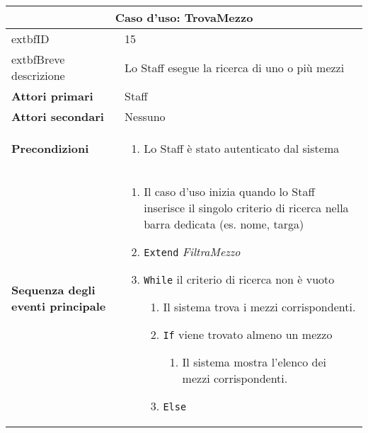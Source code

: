 \documentclass[a4paper]{report}
\begin{document}
\clearpage
\begin{table}[H]
\vspace*{-0cm}
\renewcommand{\arraystretch}{1.9}
\begin{tabular}{|p{3.9cm}|p{9.9cm}|}
\hline
\multicolumn{2}{|c|}{\textbf{Caso d’uso: TrovaMezzo}} \\ \hline
        extbf{ID} & 15 \\ \hline
        extbf{Breve descrizione} & Lo Staff esegue la ricerca di uno o più mezzi \\ \hline
	\textbf{Attori primari} & Staff \\ \hline
	\textbf{Attori secondari} & Nessuno \\ \hline
	\textbf{Precondizioni} & \begin{enumerate}[label=\arabic*.,leftmargin=14pt,labelsep=0.5em,topsep=0pt,partopsep=0pt,parsep=0pt,itemsep=0pt]
        \item Lo Staff è stato autenticato dal sistema
    \end{enumerate} \\ \hline
	\textbf{Sequenza degli eventi principale} & 
\begin{enumerate}[leftmargin=14pt,label=\arabic*.,labelsep=0.5em,topsep=0pt,partopsep=0pt,parsep=0pt,itemsep=0pt]
    \item Il caso d’uso inizia quando lo Staff inserisce il singolo criterio di ricerca nella barra dedicata (es. nome, targa)
    \item \texttt{Extend} \textit{FiltraMezzo}
    \item \texttt{While} il criterio di ricerca non è vuoto
    \begin{enumerate}[label=\arabic{enumi}.\arabic*.,leftmargin=22pt,labelsep=0.5em,topsep=0pt,partopsep=0pt,parsep=0pt,itemsep=0pt]
        \item Il sistema trova i mezzi corrispondenti.
        \item \texttt{If} viene trovato almeno un mezzo
        \begin{enumerate}[label=\arabic{enumi}.\arabic{enumii}.\arabic*.,leftmargin=22pt,labelsep=0.5em,topsep=0pt,partopsep=0pt,parsep=0pt,itemsep=0pt]
            \item Il sistema mostra l’elenco dei mezzi corrispondenti.
        \end{enumerate}
        \item \texttt{Else}
        \begin{enumerate}[label=\arabic{enumi}.\arabic{enumii}.\arabic*.,leftmargin=22pt,labelsep=0.5em,topsep=0pt,partopsep=0pt,parsep=0pt,itemsep=0pt]

\end{enumerate}
\end{enumerate}
\end{enumerate}
\end{tabular}
\end{table}
\end{document}
